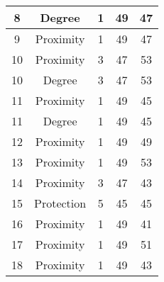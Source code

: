 \documentclass[results.tex]{subfiles}
\begin{document}
\begin{center}
\begin{tabular}{| c || c | c | c | c |}
            \hline
            8                       & Degree                       & 1                      & 49                      & 47                   \\
            \hline
            9                       & Proximity                    & 1                      & 49                      & 47                   \\
            \hline
            10                      & Proximity                    & 3                      & 47                      & 53                   \\
            \hline
            10                      & Degree                       & 3                      & 47                      & 53                   \\
            \hline
            11                      & Proximity                    & 1                      & 49                      & 45                   \\
            \hline
            11                      & Degree                       & 1                      & 49                      & 45                   \\
            \hline
            12                      & Proximity                    & 1                      & 49                      & 49                   \\
            \hline
            13                      & Proximity                    & 1                      & 49                      & 53                   \\
            \hline
            14                      & Proximity                    & 3                      & 47                      & 43                   \\
            \hline
            15                      & Protection                   & 5                      & 45                      & 45                   \\
            \hline
            16                      & Proximity                    & 1                      & 49                      & 41                   \\
            \hline
            17                      & Proximity                    & 1                      & 49                      & 51                   \\
            \hline
            18                      & Proximity                    & 1                      & 49                      & 43                   \\

\end{tabular}
\end{center}
\end{document}
